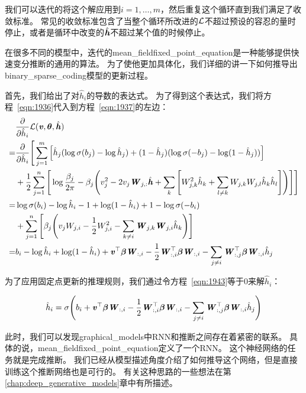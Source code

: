 我们可以迭代的将这个解应用到$i = 1,\ldots,m$，然后重复这个循环直到我们满足了收敛标准。
常见的收敛标准包含了当整个循环所改进的$\mathcal{L}$不超过预设的容忍的量时停止，或者是循环中改变的$\hat{\boldsymbol{\mathit{h}}}$不超过某个值的时候停止。

在很多不同的模型中，迭代的\gls{mean_field}\gls{fixed_point_equation}是一种能够提供快速变分推断的通用的算法。
为了使他更加具体化，我们详细的讲一下如何推导出\gls{binary_sparse_coding}模型的更新过程。


首先，我们给出了对$\hat{h}_i$的导数的表达式。
为了得到这个表达式，我们将方程~\eqref{eqn:1936}代入到方程~\eqref{eqn:1937}的左边：
\begin{align}
\label{eqn:1943}
& \frac{\partial}{\partial \hat{h}_i} \mathcal{L} (\boldsymbol{\mathit{v}},\boldsymbol{\theta},\hat{\boldsymbol{\mathit{h}}})    \\
= & \frac{\partial}{\partial \hat{h}_i} \Bigg[\sum_{j=1}^{m}\Big[\hat{h}_j (\log \sigma(b_j) - \log \hat{h}_j) + (1 - \hat{h}_j)(\log \sigma(-b_j) - \log (1-\hat{h}_j))\Big] \\
& + \frac{1}{2} \sum_{j=1}^{n} \Bigg[ \log {\frac{\beta_j}{2\pi}} - \beta_j \Bigg(v_j^2 - 2 v_j \boldsymbol{\mathit{W}}_{j,:}\hat{\boldsymbol{\mathit{h}}} + \sum_{k}\Bigg[W^2_{j,k}\hat{h}_k + \sum_{l \neq k}W_{j,k}W_{j,l}\hat{h}_k\hat{h}_l \Bigg] \Bigg) \Bigg]\Bigg] \\
= & \log \sigma(b_i) - \log \hat{h}_i - 1 + \log (1 - \hat{h}_i ) + 1 - \log \sigma (- b_i ) \\
 & + \sum_{j=1}^{n} \Bigg[\beta_j \Bigg(v_j W_{j,i} - \frac{1}{2} W_{j,i}^2 - \sum_{k \neq i} \boldsymbol{\mathit{W}}_{j,k}\boldsymbol{\mathit{W}}_{j,i} \hat{h}_k\Bigg) \Bigg]\\
 = & b_i - \log \hat{h}_i + \log (1 - \hat{h}_i ) + \boldsymbol{\mathit{v}}^{\top} {\boldsymbol{\beta}} \boldsymbol{\mathit{W}}_{:,i} - \frac{1}{2} \boldsymbol{\mathit{W}}_{:,i}^{\top} {\boldsymbol{\beta}}\boldsymbol{\mathit{W}}_{:,i} -\sum_{j\neq i}\boldsymbol{\mathit{W}}^{\top}_{:,j}{\boldsymbol{\beta}}\boldsymbol{\mathit{W}}_{:,i}\hat{h}_j 
\end{align}

为了应用固定点更新的推理规则，我们通过令方程~\eqref{eqn:1943}等于0来解$\hat{h}_i$：

\begin{align}
\label{eqn:1944}
\hat{h}_i = \sigma\Bigg(b_i + \boldsymbol{\mathit{v}}^{\top} {\boldsymbol{\beta}} \boldsymbol{\mathit{W}}_{:,i} - \frac{1}{2} \boldsymbol{\mathit{W}}_{:,i}^{\top} {\boldsymbol{\beta}} \boldsymbol{\mathit{W}}_{:,i} - \sum_{j \neq i }  \boldsymbol{\mathit{W}}_{:,j}^{\top} {\boldsymbol{\beta}}  \boldsymbol{\mathit{W}}_{:,i} \hat{h}_j \Bigg)
\end{align}

此时，我们可以发现\gls{graphical_models}中\gls{RNN}和推断之间存在着紧密的联系。
具体的说，\gls{mean_field}\gls{fixed_point_equation}定义了一个\gls{RNN}。
这个神经网络的任务就是完成推断。
我们已经从模型描述角度介绍了如何推导这个网络，但是直接训练这个推断网络也是可行的。
有关这种思路的一些想法在第\ref{chap:deep_generative_models}章中有所描述。

